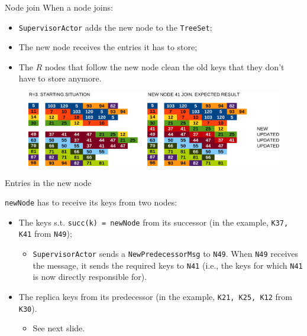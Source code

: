 \documentclass{beamer}
\begin{document}
\begin{frame}{Node join} \justify
    When a node joins:

    \begin{itemize}[label=$\bullet$]
        \item \texttt{SupervisorActor} adds the new node to the \texttt{TreeSet};
        \item The new node receives the entries it has to store;
        \item The $R$ nodes that follow the new node clean the old keys that they don't have to store anymore. 
    \end{itemize}

    \begin{figure}
        \includegraphics[width=\linewidth]{01-NodeJoin.png}
    \end{figure}
\end{frame}

\begin{frame}{Entries in the new node} \justify
    
    \texttt{newNode} has to receive its keys from two nodes:

    \begin{itemize}[label=$\bullet$]
        \item The keys s.t. \texttt{succ(k) = newNode} from its successor (in the example, \texttt{K37, K41} from \texttt{N49});
        
        \begin{itemize}[label=$\bullet$]
            \item \texttt{SupervisorActor} sends a \texttt{NewPredecessorMsg} to \texttt{N49}. When \texttt{N49} receives the message, it sends the required keys to \texttt{N41} (i.e., the keys for which \texttt{N41} is now directly responsible for).
        \end{itemize}

        \item The replica keys from its predecessor (in the example, \texttt{K21, K25, K12} from \texttt{K30}).

        \begin{itemize}[label=$\bullet$]
            \item See next slide.
        \end{itemize}

    \end{itemize}

\end{frame}
\end{document}
